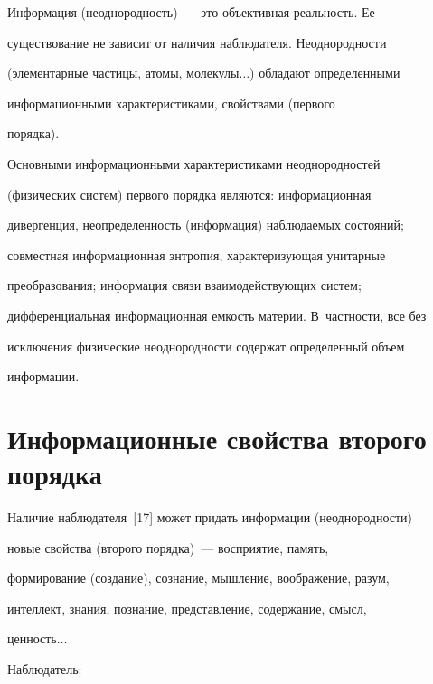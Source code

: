    Информация (неоднородность)~--- это объективная реальность. Ее 


существование не зависит от наличия наблюдателя. Неоднородности 


(элементарные частицы, атомы, молекулы$\ldots$) обладают определенными 


информационными характеристиками, свойствами (первого 


порядка).


   


   Основными информационными характеристиками неоднородностей 


(физических систем) первого порядка являются: информационная 


дивергенция, неопределенность (информация) наблюдаемых состояний; 


совместная информационная энтропия, характеризующая унитарные 


преобразования; информация связи взаимодействующих систем; 


дифференциальная информационная емкость материи. В~частности, все без 


исключения физические неоднородности содержат определенный объем 


информации.





\section{Информационные свойства второго порядка}





   Наличие наблюдателя~[17] может придать информации (неоднородности) 


новые свойства (второго порядка)~--- восприятие, память, 


формирование (создание), сознание, мышление, воображение, разум, 


интеллект, знания, познание, представление, содержание, смысл, 


ценность$\ldots$


   


   Наблюдатель:


